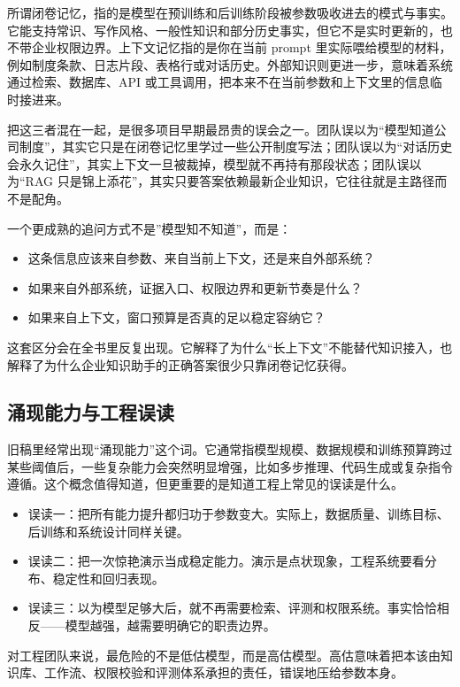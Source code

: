 所谓闭卷记忆，指的是模型在预训练和后训练阶段被参数吸收进去的模式与事实。它能支持常识、写作风格、一般性知识和部分历史事实，但它不是实时更新的，也不带企业权限边界。上下文记忆指的是你在当前 prompt 里实际喂给模型的材料，例如制度条款、日志片段、表格行或对话历史。外部知识则更进一步，意味着系统通过检索、数据库、API 或工具调用，把本来不在当前参数和上下文里的信息临时接进来。

把这三者混在一起，是很多项目早期最昂贵的误会之一。团队误以为“模型知道公司制度”，其实它只是在闭卷记忆里学过一些公开制度写法；团队误以为“对话历史会永久记住”，其实上下文一旦被裁掉，模型就不再持有那段状态；团队误以为“RAG 只是锦上添花”，其实只要答案依赖最新企业知识，它往往就是主路径而不是配角。

一个更成熟的追问方式不是”模型知不知道”，而是：
\begin{itemize}
  \item 这条信息应该来自参数、来自当前上下文，还是来自外部系统？
  \item 如果来自外部系统，证据入口、权限边界和更新节奏是什么？
  \item 如果来自上下文，窗口预算是否真的足以稳定容纳它？
\end{itemize}

这套区分会在全书里反复出现。它解释了为什么“长上下文”不能替代知识接入，也解释了为什么企业知识助手的正确答案很少只靠闭卷记忆获得。

\subsection{涌现能力与工程误读}
旧稿里经常出现“涌现能力”这个词。它通常指模型规模、数据规模和训练预算跨过某些阈值后，一些复杂能力会突然明显增强，比如多步推理、代码生成或复杂指令遵循。这个概念值得知道，但更重要的是知道工程上常见的误读是什么。

\begin{itemize}
  \item 误读一：把所有能力提升都归功于参数变大。实际上，数据质量、训练目标、后训练和系统设计同样关键。
  \item 误读二：把一次惊艳演示当成稳定能力。演示是点状现象，工程系统要看分布、稳定性和回归表现。
  \item 误读三：以为模型足够大后，就不再需要检索、评测和权限系统。事实恰恰相反——模型越强，越需要明确它的职责边界。
\end{itemize}

对工程团队来说，最危险的不是低估模型，而是高估模型。高估意味着把本该由知识库、工作流、权限校验和评测体系承担的责任，错误地压给参数本身。

